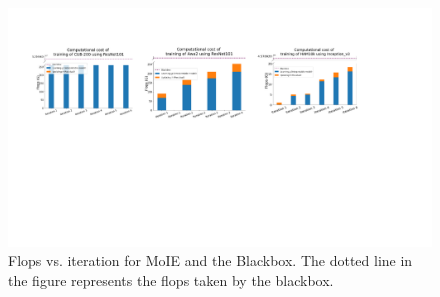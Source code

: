 \documentclass[nohyperref]{article}
\theoremstyle{plain}
\theoremstyle{definition}
\theoremstyle{remark}
\begin{document}
\begin{figure}[h]
\centering
\includegraphics[width=1.0\textwidth]
{figures/Supp/Flops.pdf}
\caption{Flops vs. iteration for MoIE and the Blackbox. The dotted line in the figure represents the flops taken by the blackbox.}
\label{fig:flops}
\end{figure}


% 





\end{document}
